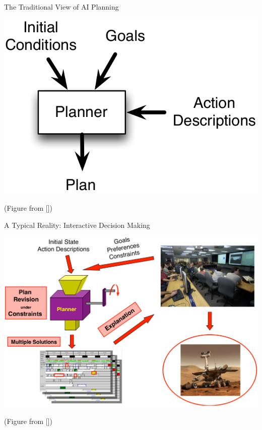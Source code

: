 \subsection*{}

\begin{frame}{The Traditional View of AI Planning}

\centering

\medskip

\includegraphics[height=0.5\textheight]{david-traditional}

\medskip

{\footnotesize (Figure from [\cite{smith:aaai-12}])}

\end{frame}


\begin{frame}{A Typical Reality: Interactive Decision Making}

\centering

\includegraphics[height=0.75\textheight]{david-process}

\medskip

{\footnotesize (Figure from [\cite{smith:aaai-12}])}

\end{frame}



